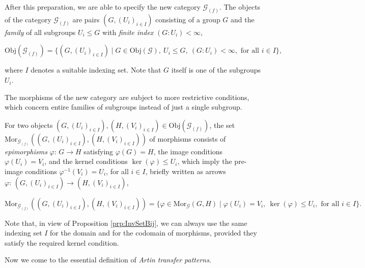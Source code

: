 \documentclass{amsart}
\theoremstyle{definition}
\numberwithin{equation}{section}
\begin{document}
After this preparation, we are able to specify the new category \(\mathcal{G}_{(f)}\).
The objects of the category \(\mathcal{G}_{(f)}\) are pairs \((G,(U_i)_{i\in I})\)
consisting of a group \(G\)
and the \textit{family} of all subgroups \(U_i\le G\) with \textit{finite index} \((G:U_i)<\infty\),

\begin{equation}
\label{eqn:ObjGFam}
\mathrm{Obj}(\mathcal{G}_{(f)})=\lbrace (G,(U_i)_{i\in I})\mid
G\in\mathrm{Obj}(\mathcal{G}),\ U_i\le G,\ (G:U_i)<\infty, \text{ for all } i\in I\rbrace,
\end{equation}

\noindent
where \(I\) denotes a suitable indexing set.
Note that \(G\) itself is one of the subgroups \(U_i\).

The morphisms of the new category are subject to more restrictive conditions,
which concern entire families of subgroups instead of just a single subgroup.

For two objects \((G,(U_i)_{i\in I}),(H,(V_i)_{i\in I})\in\mathrm{Obj}(\mathcal{G}_{(f)})\),
the set \(\mathrm{Mor}_{\mathcal{G}_{(f)}}((G,(U_i)_{i\in I}),(H,(V_i)_{i\in I}))\) of morphisms
consists of \textit{epimorphisms} \(\varphi:\,G\to H\) satisfying \(\varphi(G)=H\),
the image conditions \(\varphi(U_i)=V_i\),
and the kernel conditions \(\ker(\varphi)\le U_i\),
which imply the pre-image conditions \(\varphi^{-1}(V_i)=U_i\), for all \(i\in I\),
briefly written as arrows \(\varphi:\,(G,(U_i)_{i\in I})\to (H,(V_i)_{i\in I})\),

\begin{equation}
\label{eqn:MorGFam}
\mathrm{Mor}_{\mathcal{G}_{(f)}}((G,(U_i)_{i\in I}),(H,(V_i)_{i\in I}))=\lbrace\varphi\in\mathrm{Mor}_{\mathcal{G}}(G,H)\mid\varphi(U_i)=V_i,\ \ker(\varphi)\le U_i, \text{ for all } i\in I\rbrace.
\end{equation}

\noindent
Note that, in view of Proposition
\ref{prp:InvSetBij},
we can always use the same indexing set \(I\) for the domain and for the codomain
of morphisms, provided they satisfy the required kernel condition.

Now we come to the essential definition of \textit{Artin transfer patterns}.
\end{document}
